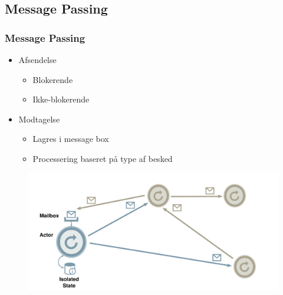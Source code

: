 \subsection{Message Passing}
\begin{frame}
  \frametitle{Message Passing}
  \begin{itemize}
    \item Afsendelse
    \begin{itemize}
      \item Blokerende
      \item Ikke-blokerende
    \end{itemize}
    \item Modtagelse
    \begin{itemize}
      \item Lagres i message box
      \item Processering baseret på type af besked
    \end{itemize}
  \end{itemize}
  \begin{figure}[htbp]
  \centering
  \includegraphics[width=\textwidth]{Images/actors.pdf}
  \end{figure}
\end{frame}
